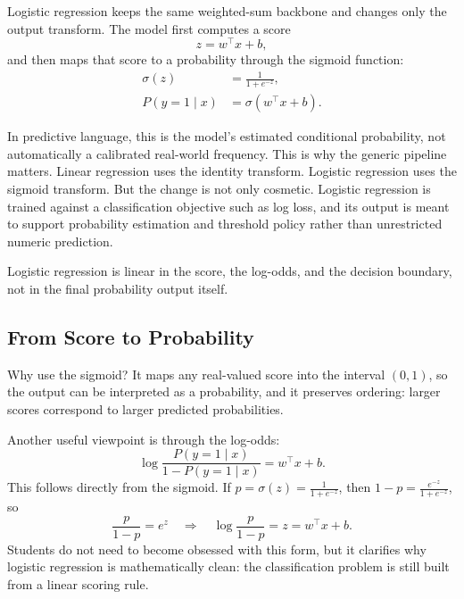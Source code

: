 Logistic regression keeps the same weighted-sum backbone and changes only the output transform. The model first computes a score
\[
z = w^\top x + b,
\]
and then maps that score to a probability through the sigmoid function:
\begin{align*}
\sigma(z) &= \frac{1}{1 + e^{-z}}, \\
P(y=1 \mid x) &= \sigma(w^\top x + b).
\end{align*}

In predictive language, this is the model's estimated conditional probability, not automatically a calibrated real-world frequency. This is why the generic pipeline matters. Linear regression uses the identity transform. Logistic regression uses the sigmoid transform. But the change is not only cosmetic. Logistic regression is trained against a classification objective such as log loss, and its output is meant to support probability estimation and threshold policy rather than unrestricted numeric prediction.

Logistic regression is linear in the score, the log-odds, and the decision boundary, not in the final probability output itself.

\subsection{From Score to Probability}

Why use the sigmoid? It maps any real-valued score into the interval $(0,1)$, so the output can be interpreted as a probability, and it preserves ordering: larger scores correspond to larger predicted probabilities.

Another useful viewpoint is through the log-odds:
\[
\log \frac{P(y=1 \mid x)}{1 - P(y=1 \mid x)} = w^\top x + b.
\]
This follows directly from the sigmoid. If $p=\sigma(z)=\frac{1}{1+e^{-z}}$, then $1-p=\frac{e^{-z}}{1+e^{-z}}$, so
\[
\frac{p}{1-p}=e^z
\quad\Longrightarrow\quad
\log\frac{p}{1-p}=z=w^\top x+b.
\]
Students do not need to become obsessed with this form, but it clarifies why logistic regression is mathematically clean: the classification problem is still built from a linear scoring rule.

